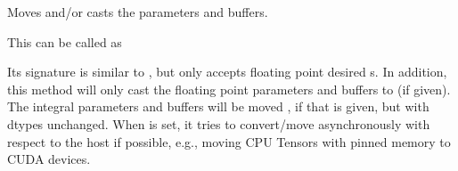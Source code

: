 \documentclass[letterpaper,10pt,english]{sphinxmanual}
\begin{document}
\begin{fulllineitems}
\begin{fulllineitems}
\end{fulllineitems}


\begin{fulllineitems}
\label{\detokenize{api/dynamics:geology.metamodelling.dynamics.LatentSpaceDynamics.to}}
Moves and/or casts the parameters and buffers.

This can be called as

\begin{fulllineitems}
\end{fulllineitems}


\begin{fulllineitems}
\end{fulllineitems}


\begin{fulllineitems}
\end{fulllineitems}


Its signature is similar to , but only accepts
floating point desired  s. In addition, this method will
only cast the floating point parameters and buffers to 
(if given). The integral parameters and buffers will be moved
, if that is given, but with dtypes unchanged. When
 is set, it tries to convert/move asynchronously
with respect to the host if possible, e.g., moving CPU Tensors with
pinned memory to CUDA devices.


\end{fulllineitems}
\end{fulllineitems}
\end{document}
